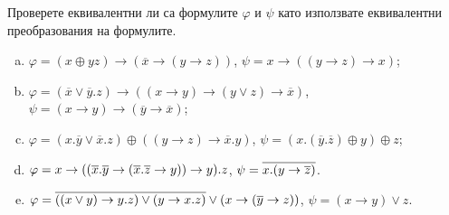 \begin{problem} %
  Проверете еквивалентни ли са формулите $\varphi$ и $\psi$ като използвате еквивалентни преобразования на формулите.
  \begin{enumerate}[a)]
  \item
    $\varphi = (x\oplus yz)\rightarrow (\overline{x}\rightarrow (y\rightarrow z))$,
    $\psi = x\rightarrow ((y\rightarrow z)\rightarrow x)$;
  \item
    $\varphi = (\overline{x}\vee \overline{y}.z)\rightarrow ((x\rightarrow y)\rightarrow (y\vee z)\rightarrow\overline{x})$,
    $\psi = (x\rightarrow y)\rightarrow(\overline{y}\rightarrow\overline{x})$;
  \item
    $\varphi = (x.\overline{y}\vee \overline{x}.z)\oplus ((y\rightarrow z)\rightarrow \overline{x}.y)$,
    $\psi = (x.(\overline{y}.\overline{z})\oplus y)\oplus z$;
  \item
    $\varphi = x\rightarrow ((\overline{x}.\overline{y}\rightarrow(\overline{x}.\overline{z}\rightarrow y))\rightarrow y).z$,
    $\psi = \overline{x.(y\rightarrow\overline{z})}$.
  \item
    $\varphi = \overline{((x\vee y) \rightarrow y.z)\vee (y\rightarrow x.z)} \vee (x\rightarrow (\overline{y}\rightarrow z))$,
    $\psi = (x\rightarrow y)\vee z$.
  \end{enumerate}
\end{problem}
